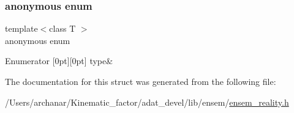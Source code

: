 \subsubsection{\texorpdfstring{anonymous enum}{anonymous enum}}
{\footnotesize\ttfamily template$<$class T $>$ \\
anonymous enum}

\begin{DoxyEnumFields}{Enumerator}
[0pt][0pt]{}\mbox{\label{structENSEM_1_1EnsbcIO_3_01RComplex_3_01T_01_4_01_4_aff9ef4c8a5fd9ee825329a4a5f6a8cf0a5b3708c9fa3a312e76feca278f14a7d3}} 
type&\\
\hline

\end{DoxyEnumFields}


The documentation for this struct was generated from the following file\+:\begin{DoxyCompactItemize}
\item 
/\+Users/archanar/\+Kinematic\+\_\+factor/adat\+\_\+devel/lib/ensem/\mbox{\hyperlink{lib_2ensem_2ensem__reality_8h}{ensem\+\_\+reality.\+h}}\end{DoxyCompactItemize}
